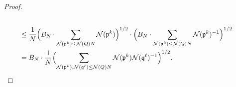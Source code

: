 \documentclass[11pt]{amsart}
\theoremstyle{definition}
\newcommand{\NN}{{\mathcal N}}
\newcommand{\mf}{\mathfrak}
\newcommand{\FM}[1]{{\color{violet}{{#1}}}}
\newcommand{\WS}[1]{{\color{blue}{{#1}}}}
\begin{document}
\begin{proof}
\begin{equation}
\begin{split}
          \\&\leq \frac{1}{N}\Bigl(B_{N}\cdot\sum_{\NN(\mf p^{k})\leq \NN(Q)N}\NN(\mf p^{k})\Bigr)^{1/2}\cdot\Bigl(B_{N}\cdot\sum_{\NN(\mf p^{k})\leq \NN(Q)N}\NN(\mf p^{k})^{-1}\Bigr)^{1/2}
          \\&=B_{N}\cdot \frac{1}{N}\Bigl(\sum_{\NN(\mf p^{k}),\NN(\mf q^{\ell})\leq \NN(Q)N}\NN(\mf p^{k})\NN(\mf q^{\ell})^{-1}\Bigr)^{1/2}.
          \end{split}
\end{equation}

\end{proof}
\end{document}
